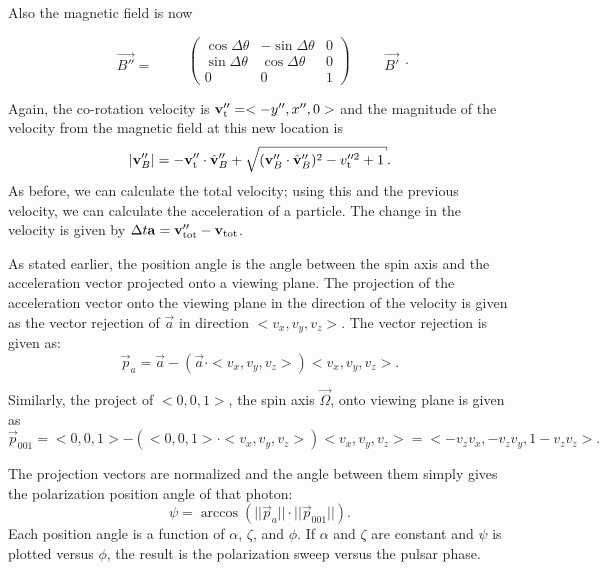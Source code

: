 Also the magnetic field is now

\begin{equation}
\begin{array}{c}
             \\
\vec{B''}= \\
             \end{array}
\qquad
\left( \begin{array}{ccc}
\cos\Delta\theta & -\sin\Delta\theta & 0 \\
\sin\Delta\theta &  \cos\Delta\theta & 0 \\
0                & 0                 & 1 \end{array} \right)
\qquad
\begin{array}{c}
             \\ 
\vec{B'} \\
             \end{array}. \end{equation}

Again, the co-rotation velocity is $\vec{v}_{\rm t}''=<-y'',x'',0>$ and
the magnitude of the velocity from the magnetic field at this new location is
\begin{equation}
|\vec{v}_B''|=-\vec{v}_{\rm t}'' \cdot \hat{v}_B'' + \sqrt{(\vec{v}_B'' \cdot \hat{v}_B'')^2 - v_{\rm t}''^2 +1}
.\end{equation}
As before, we can calculate the total velocity; using this and the previous
velocity, we can calculate the acceleration of a particle. 
The change in the velocity is given by  $\Delta t \vec{a} = \vec{v}_{\rm tot}'' - \vec{v}_{\rm tot}$.

As stated earlier, the position angle is the angle between the spin axis and the acceleration vector projected onto a viewing
plane.
The projection of the acceleration vector onto the 
viewing plane in the direction of the velocity is given as 
the vector rejection of $\vec{a}$ in direction $<v_x,v_y,v_z>$.
The vector rejection is given as:
\begin{equation}\vec{p}_a=\vec{a} - (\vec{a} \cdot <v_x,v_y,v_z>) <v_x,v_y,v_z>.\end{equation}

Similarly, the project of $<0,0,1>$, the spin axis $\vec{\Omega}$, onto viewing plane is given as
\begin{equation}\vec{p}_{001}= <0,0,1> -(<0,0,1> \cdot <v_x,v_y,v_z>) <v_x,v_y,v_z> = <-v_z v_x,-v_z v_y,1-v_z v_z>.\end{equation}

The projection vectors are normalized and the angle between them simply gives the polarization position angle
of that photon:
\begin{equation}\psi=\arccos(||\vec{p}_a|| \cdot ||\vec{p}_{001}||).\end{equation}
Each position angle is a function of $\alpha$, $\zeta$, and $\phi$.  
If $\alpha$ and $\zeta$ are constant and $\psi$ is plotted versus $\phi$,
the result is the polarization sweep versus the pulsar phase.
